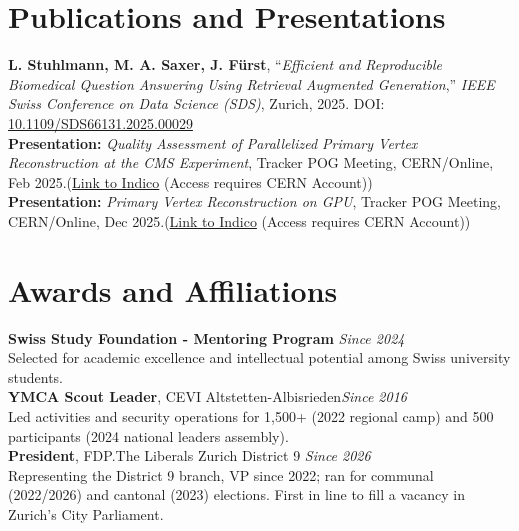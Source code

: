 \documentclass[a4paper,10pt]{article}
\begin{document}
\vspace{0.5em}
\section*{Publications and Presentations}

\textbf{L. Stuhlmann, M. A. Saxer, J. Fürst}, “\textit{Efficient and Reproducible Biomedical Question Answering Using Retrieval Augmented Generation},” \textit{IEEE Swiss Conference on Data Science (SDS)}, Zurich, 2025. DOI: \href{https://doi.org/10.1109/SDS66131.2025.00029}{10.1109/SDS66131.2025.00029}\\[4pt]
\textbf{Presentation:} \textit{Quality Assessment of Parallelized Primary Vertex Reconstruction at the CMS Experiment}, Tracker POG Meeting, CERN/Online, Feb 2025.(\href{https://indico.cern.ch/event/1498184/}{Link to Indico} (Access requires CERN Account))\\[4pt]
\textbf{Presentation:} \textit{Primary Vertex Reconstruction on GPU}, Tracker POG Meeting, CERN/Online, Dec 2025.(\href{https://indico.cern.ch/event/1616105/}{Link to Indico} (Access requires CERN Account))
\vspace{0.5em}
\newpage
\section*{Awards and Affiliations}

\textbf{Swiss Study Foundation - Mentoring Program} \hfill \textit{Since 2024}\\
Selected for academic excellence and intellectual potential among Swiss university students.\\[4pt]
\textbf{YMCA Scout Leader}, CEVI Altstetten-Albisrieden\hfill \textit{Since 2016}\\
Led activities and security operations for 1,500+ (2022 regional camp) and 500 participants (2024 national leaders assembly).\\[4pt]
\textbf{President}, FDP.The Liberals Zurich District 9 \hfill \textit{Since 2026}\\
Representing the District 9 branch, VP since 2022; ran for communal (2022/2026) and cantonal (2023) elections. First in line to fill a vacancy in Zurich’s City Parliament.

\vspace{0.5em}
\end{document}
